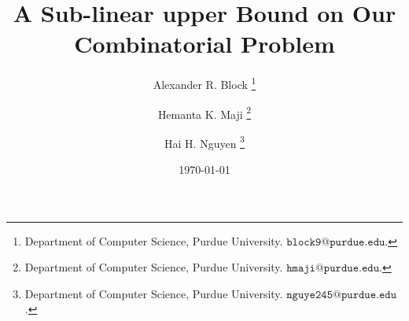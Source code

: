 \documentclass[11pt]{article}
\begin{document}
\def\majiemail{hmaji@purdue.edu}
\def\haiemail{nguye245@purdue.edu}
\def\alexemail{block9@purdue.edu}
\author{
  Alexander R. Block%
  \thanks{
	  Department of Computer Science,
	  Purdue University.
	  \href{mailto:\alexemail}{$\mathtt{\alexemail}$}.
  }\and 
  Hemanta K. Maji%
  \thanks{
    Department of Computer Science,
    Purdue University.
    \href{mailto:\majiemail}{$\mathtt{\majiemail}$}.
  }\and
  Hai H. Nguyen%
  \thanks{
	  Department of Computer Science,
	  Purdue University.
	  \href{mailto:\haiemail}{$\mathtt{\haiemail}$}.
  } 
}


\title{A Sub-linear upper Bound on Our Combinatorial Problem}

\date{\today}

\maketitle

\pagestyle{empty}
\thispagestyle{empty}

%

\newpage
\newlength{\temp}
\setlength{\temp}{\parskip}
\setlength{\parskip}{.4\parskip}
\tableofcontents
\setlength{\parskip}{\temp}

\newpage
\setcounter{page}{1}
\pagestyle{plain}

\newpage





\newpage
\appendix
\end{document}
